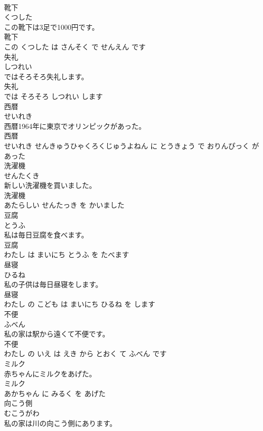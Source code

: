 \documentclass[8pt]{extreport}
\begin{document}
\begin{CJK}{UTF8}{min}
\\	靴下	
\\	くつした			
\\	この靴下は3足で1000円です。	
\\	靴下 
\\	この くつした は さんそく で せんえん です			
\\	失礼	
\\	しつれい			
\\	ではそろそろ失礼します。	
\\	失礼 
\\	では そろそろ しつれい します			
\\	西暦	
\\	せいれき			
\\	西暦1964年に東京でオリンピックがあった。	
\\	西暦 
\\	せいれき せんきゅうひゃくろくじゅうよねん に とうきょう で おりんぴっく が あった			
\\	洗濯機	
\\	せんたくき			
\\	新しい洗濯機を買いました。	
\\	洗濯機 
\\	あたらしい せんたっき を かいました			
\\	豆腐	
\\	とうふ			
\\	私は毎日豆腐を食べます。	
\\	豆腐 
\\	わたし は まいにち とうふ を たべます			
\\	昼寝	
\\	ひるね			
\\	私の子供は毎日昼寝をします。	
\\	昼寝 
\\	わたし の こども は まいにち ひるね を します			
\\	不便	
\\	ふべん			
\\	私の家は駅から遠くて不便です。	
\\	不便 
\\	わたし の いえ は えき から とおく て ふべん です			
\\	ミルク	
\\	赤ちゃんにミルクをあげた。	
\\	ミルク 
\\	あかちゃん に みるく を あげた			
\\	向こう側	
\\	むこうがわ			
\\	私の家は川の向こう側にあります。	

\end{CJK}
\end{document}
